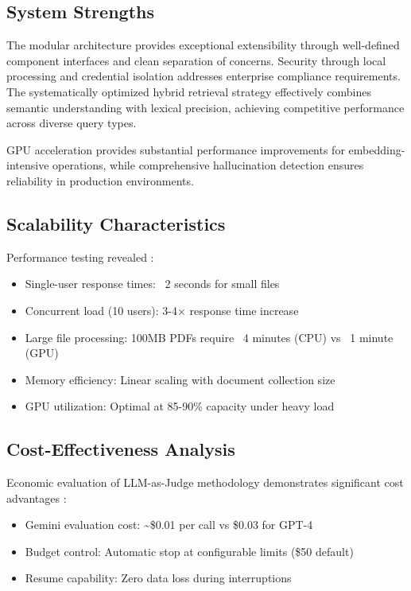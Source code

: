\documentclass[11pt]{article}
\begin{document}
\subsection{System Strengths}

The modular architecture provides exceptional extensibility through well-defined component interfaces and clean separation of concerns. Security through local processing and credential isolation addresses enterprise compliance requirements. The systematically optimized hybrid retrieval strategy effectively combines semantic understanding with lexical precision, achieving competitive performance across diverse query types.

GPU acceleration provides substantial performance improvements for embedding-intensive operations, while comprehensive hallucination detection ensures reliability in production environments.

\subsection{Scalability Characteristics}

Performance testing revealed \cite{pytorchcuda,johnson2019faiss}:
\begin{itemize}
\item Single-user response times: ~2 seconds for small files
\item Concurrent load (10 users): 3-4× response time increase
\item Large file processing: 100MB PDFs require ~4 minutes (CPU) vs ~1 minute (GPU) \cite{pytorchcuda}
\item Memory efficiency: Linear scaling with document collection size
\item GPU utilization: Optimal at 85-90\% capacity under heavy load
\end{itemize}

\subsection{Cost-Effectiveness Analysis}

Economic evaluation of LLM-as-Judge methodology demonstrates significant cost advantages \cite{llm_judge}:

\begin{itemize}
\item Gemini evaluation cost: \textasciitilde\$0.01 per call vs \$0.03 for GPT-4
\item Budget control: Automatic stop at configurable limits (\$50 default)
\item Resume capability: Zero data loss during interruptions
\end{itemize}
\end{document}
